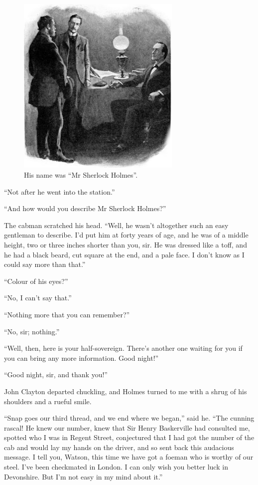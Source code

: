 \documentclass[paper=5.5in:8.5in,BCOR=7mm,twoside,DIV=calc,12pt,usegeometry,openany,chapterprefix,endperiod]{scrbook} %
\begin{document}
\begin{figure}[tbhp]
\centering
\includegraphics[width=0.7\textwidth]{05_cabman}
\caption{His name was \enquote{Mr Sherlock Holmes}.}
\end{figure}

\afterpage{\clearpage}


\enquote{Not after he went into the station.}

\enquote{And how would you describe Mr Sherlock Holmes?}

The cabman scratched his head. \enquote{Well, he wasn't altogether such an easy gentleman to describe. I'd put him at forty years of age, and he was of a middle height, two or three inches shorter than you, sir. He was dressed like a toff, and he had a black beard, cut square at the end, and a pale face. I don't know as I could say more than that.}

\enquote{Colour of his eyes?}

\enquote{No, I can't say that.}

\enquote{Nothing more that you can remember?}

\enquote{No, sir; nothing.}

\enquote{Well, then, here is your half-sovereign. There's another one waiting for you if you can bring any more information. Good night!}

\enquote{Good night, sir, and thank you!}

John Clayton departed chuckling, and Holmes turned to me with a shrug of his shoulders and a rueful smile.

\enquote{Snap goes our third thread, and we end where we began,} said he. \enquote{The cunning rascal! He knew our number, knew that Sir Henry Baskerville had consulted me, spotted who I was in Regent Street, conjectured that I had got the number of the cab and would lay my hands on the driver, and so sent back this audacious message. I tell you, Watson, this time we have got a foeman who is worthy of our steel. I've been checkmated in London. I can only wish you better luck in Devonshire. But I'm not easy in my mind about it.}
\end{document}
